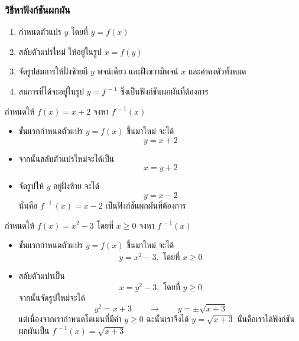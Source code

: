 \begin{frame}
\end{frame}

\begin{frame}
\frametitle{วิธีหาฟังก์ชันผกผัน}
\begin{block}{}
\begin{enumerate}
\item กำหนดตัวแปร $y$ โดยที่ $y = f(x)$  \pa
\item สลับตัวแปรใหม่ ให้อยู่ในรูป $x = f(y)$ \pa
\item จัดรูปสมการให้ฝั่งซ้ายมี $y$ พจน์เดียว และฝั่งขวามีพจน์ $x$ และค่าคงตัวทั้งหมด \pa
\item สมการที่ได้จะอยู่ในรูป $y = f^{\, -1}$ ซึ่งเป็นฟังก์ชันผกผันที่ต้องการ
\end{enumerate}
\end{block}
\end{frame}


\begin{frame}[t]
\begin{ex}
กำหนดให้ $f(x) = x+2$ จงหา $f^{\, -1}(x)$
\end{ex}
\begin{sol}
\begin{itemize}
\item ขั้นแรกกำหนดตัวแปร $y = f(x)$ ขึ้นมาใหม่ \pa จะได้ 
\[y = x+2\] \pa
\item จากนั้นสลับตัวแปรใหม่จะได้เป็น \pa
\[x = y+2\] \pa
\item จัดรูปให้ $y$ อยู่ฝั่งซ้าย \pa จะได้
\[y = x-2\] \pa 
นั่นคือ $f^{-1}\,(x) = x-2$ เป็นฟังก์ชันผกผันที่ต้องการ
\end{itemize}
\end{sol}
\end{frame}


\begin{frame}[t]
\begin{ex}
กำหนดให้ $f(x) = x^2-3$ โดยที่ $x \geq 0$ จงหา $f^{\, -1}(x)$
\end{ex}
\begin{sol}
\begin{itemize}
\item ขั้นแรกกำหนดตัวแปร $y = f(x)$ ขึ้นมาใหม่ \pa จะได้ 
\[y = x^2-3, \text{ โดยที่ } x \geq 0\] \pa
\item สลับตัวแปรเป็น \pa
\[x = y^2-3, \text{ โดยที่ } y \geq 0\] \pa
จากนั้นจัดรูปใหม่\pa จะได้ 
\[y^2 = x+3  \qquad \rightarrow \qquad y = \pm \sqrt{x+3}\]
\pa แต่เนื่องจากเรากำหนดโดเมนที่มีค่า $y \geq 0$ \pa ฉะนั้นเราจึงได้ $y = \sqrt{x+3}$ \pa นั่นคือเราได้ฟังก์ชันผกผันเป็น  $f^{\, -1}(x) = \sqrt{x+3}$
\end{itemize}
\end{sol}
\end{frame}

